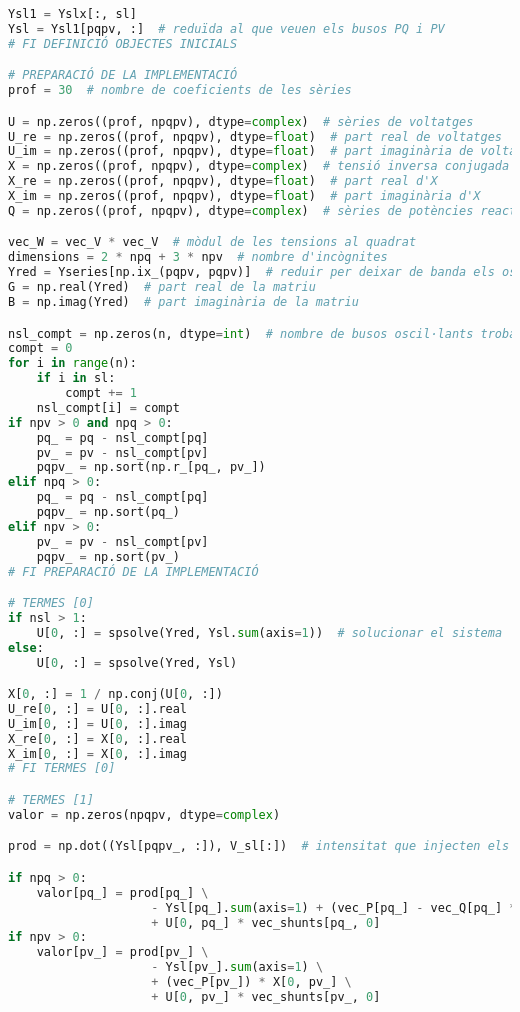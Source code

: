 \begin{lstlisting}[language=Python,numbers=none]
Ysl1 = Yslx[:, sl]
Ysl = Ysl1[pqpv, :]  # reduïda al que veuen els busos PQ i PV
# FI DEFINICIÓ OBJECTES INICIALS

# PREPARACIÓ DE LA IMPLEMENTACIÓ
prof = 30  # nombre de coeficients de les sèries

U = np.zeros((prof, npqpv), dtype=complex)  # sèries de voltatges
U_re = np.zeros((prof, npqpv), dtype=float)  # part real de voltatges
U_im = np.zeros((prof, npqpv), dtype=float)  # part imaginària de voltatges
X = np.zeros((prof, npqpv), dtype=complex)  # tensió inversa conjugada
X_re = np.zeros((prof, npqpv), dtype=float)  # part real d'X
X_im = np.zeros((prof, npqpv), dtype=float)  # part imaginària d'X
Q = np.zeros((prof, npqpv), dtype=complex)  # sèries de potències reactives

vec_W = vec_V * vec_V  # mòdul de les tensions al quadrat
dimensions = 2 * npq + 3 * npv  # nombre d'incògnites
Yred = Yseries[np.ix_(pqpv, pqpv)]  # reduir per deixar de banda els oscil·lants
G = np.real(Yred)  # part real de la matriu
B = np.imag(Yred)  # part imaginària de la matriu

nsl_compt = np.zeros(n, dtype=int)  # nombre de busos oscil·lants trobats abans d'un bus
compt = 0
for i in range(n):
    if i in sl:
        compt += 1
    nsl_compt[i] = compt
if npv > 0 and npq > 0:
    pq_ = pq - nsl_compt[pq]
    pv_ = pv - nsl_compt[pv]
    pqpv_ = np.sort(np.r_[pq_, pv_])
elif npq > 0:
    pq_ = pq - nsl_compt[pq]
    pqpv_ = np.sort(pq_)
elif npv > 0:
    pv_ = pv - nsl_compt[pv]
    pqpv_ = np.sort(pv_)
# FI PREPARACIÓ DE LA IMPLEMENTACIÓ

# TERMES [0]
if nsl > 1:
    U[0, :] = spsolve(Yred, Ysl.sum(axis=1))  # solucionar el sistema
else:
    U[0, :] = spsolve(Yred, Ysl)

X[0, :] = 1 / np.conj(U[0, :])
U_re[0, :] = U[0, :].real
U_im[0, :] = U[0, :].imag
X_re[0, :] = X[0, :].real
X_im[0, :] = X[0, :].imag
# FI TERMES [0]

# TERMES [1]
valor = np.zeros(npqpv, dtype=complex)

prod = np.dot((Ysl[pqpv_, :]), V_sl[:])  # intensitat que injecten els oscil·lants

if npq > 0:
    valor[pq_] = prod[pq_] \
                    - Ysl[pq_].sum(axis=1) + (vec_P[pq_] - vec_Q[pq_] * 1j) * X[0, pq_] \
                    + U[0, pq_] * vec_shunts[pq_, 0]
if npv > 0:
    valor[pv_] = prod[pv_] \
                    - Ysl[pv_].sum(axis=1) \
                    + (vec_P[pv_]) * X[0, pv_] \
                    + U[0, pv_] * vec_shunts[pv_, 0]


\end{lstlisting}
